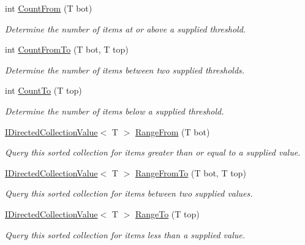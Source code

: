 \begin{DoxyCompactItemize}
int \hyperlink{class_c5_1_1_sorted_array_a7249ec52c01564107e7825c1e81e0761}{Count\+From} (T bot)
\begin{DoxyCompactList}\small\item\em Determine the number of items at or above a supplied threshold. \end{DoxyCompactList}\item 
int \hyperlink{class_c5_1_1_sorted_array_a28de6027688415f83909e0460616b87a}{Count\+From\+To} (T bot, T top)
\begin{DoxyCompactList}\small\item\em Determine the number of items between two supplied thresholds. \end{DoxyCompactList}\item 
int \hyperlink{class_c5_1_1_sorted_array_afdcdd10a075fef3093f83f70fee1b6e3}{Count\+To} (T top)
\begin{DoxyCompactList}\small\item\em Determine the number of items below a supplied threshold. \end{DoxyCompactList}\item 
\hyperlink{interface_c5_1_1_i_directed_collection_value}{I\+Directed\+Collection\+Value}$<$ T $>$ \hyperlink{class_c5_1_1_sorted_array_a54dfeacd3329e925177d9abdaa720b82}{Range\+From} (T bot)
\begin{DoxyCompactList}\small\item\em Query this sorted collection for items greater than or equal to a supplied value. \end{DoxyCompactList}\item 
\hyperlink{interface_c5_1_1_i_directed_collection_value}{I\+Directed\+Collection\+Value}$<$ T $>$ \hyperlink{class_c5_1_1_sorted_array_aea0cffb0031187ea06e1412dd1676d8a}{Range\+From\+To} (T bot, T top)
\begin{DoxyCompactList}\small\item\em Query this sorted collection for items between two supplied values. \end{DoxyCompactList}\item 
\hyperlink{interface_c5_1_1_i_directed_collection_value}{I\+Directed\+Collection\+Value}$<$ T $>$ \hyperlink{class_c5_1_1_sorted_array_ac6751141ca64a0e0dd3e5d45a7f4e4b2}{Range\+To} (T top)
\begin{DoxyCompactList}\small\item\em Query this sorted collection for items less than a supplied value. \end{DoxyCompactList}\item 

\end{DoxyCompactItemize}
